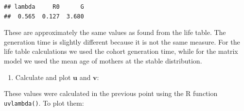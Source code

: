 \documentclass[
]{book}
\newenvironment{Shaded}{\begin{snugshade}}{\end{snugshade}}
\newcommand{\CommentTok}[1]{\textcolor[rgb]{0.56,0.35,0.01}{\textit{#1}}}
\newcommand{\DecValTok}[1]{\textcolor[rgb]{0.00,0.00,0.81}{#1}}
\newcommand{\FunctionTok}[1]{\textcolor[rgb]{0.00,0.00,0.00}{#1}}
\newcommand{\NormalTok}[1]{#1}
\newcommand{\OtherTok}[1]{\textcolor[rgb]{0.56,0.35,0.01}{#1}}
\newcommand{\SpecialCharTok}[1]{\textcolor[rgb]{0.00,0.00,0.00}{#1}}
\newcommand{\StringTok}[1]{\textcolor[rgb]{0.31,0.60,0.02}{#1}}
\providecommand{\tightlist}{%
  \setlength{\itemsep}{0pt}\setlength{\parskip}{0pt}}
\begin{document}
\begin{Shaded}
\end{Shaded}

\begin{verbatim}
## lambda     R0      G 
##  0.565  0.127  3.680
\end{verbatim}

These are approximately the same values as found from the life table. The generation time is slightly different because it is not the same measure. For the life table calculations we used the cohort generation time, while for the matrix model we used the mean age of mothers at the stable distribution.

\begin{enumerate}
\def\labelenumi{\arabic{enumi}.}
\setcounter{enumi}{5}
\tightlist
\item
  Calculate and plot \(\mathbf{u}\) and \(\mathbf{v}\):
\end{enumerate}

These values were calculated in the previous point using the R function \texttt{uvlambda()}. To plot them:
\end{document}
